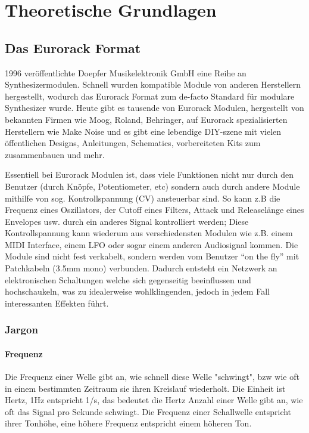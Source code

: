 \chapter{Theoretische Grundlagen}

\section{Das Eurorack Format}
\label{sec:org68c13b5}

1996 veröffentlichte Doepfer Musikelektronik GmbH eine Reihe an Synthesizermodulen. Schnell wurden kompatible Module von anderen Herstellern hergestellt, wodurch das Eurorack Format zum de-facto Standard für modulare Synthesizer wurde. Heute gibt es tausende von Eurorack Modulen, hergestellt von bekannten Firmen wie Moog, Roland, Behringer, auf Eurorack spezialisierten Herstellern wie Make Noise und es gibt eine lebendige DIY-szene mit vielen öffentlichen Designs, Anleitungen, Schematics, vorbereiteten Kits zum zusammenbauen und mehr.

Essentiell bei Eurorack Modulen ist, dass viele Funktionen nicht nur durch den Benutzer (durch Knöpfe, Potentiometer, etc) sondern auch durch andere Module mithilfe von sog. Kontrollspannung (CV) ansteuerbar sind. So kann z.B die Frequenz eines Oszillators, der Cutoff eines Filters, Attack und Releaselänge eines Envelopes usw. durch ein anderes Signal kontrolliert werden; Diese Kontrollspannung kann wiederum aus verschiedensten Modulen wie z.B. einem MIDI Interface, einem LFO oder sogar einem anderen Audiosignal kommen. Die Module sind nicht fest verkabelt, sondern werden vom Benutzer ``on the fly'' mit Patchkabeln (3.5mm mono) verbunden. Dadurch entsteht ein Netzwerk an elektronischen Schaltungen welche sich gegenseitig beeinflussen und hochschaukeln, was zu idealerweise wohlklingenden, jedoch in jedem Fall interessanten Effekten führt.

\subsection{Jargon}
\label{sec:org720f6d8}
\subsubsection{Frequenz}
\label{sec:org9846a3c}
Die Frequenz einer Welle gibt an, wie schnell diese Welle "schwingt", bzw wie oft in einem bestimmten Zeitraum sie ihren Kreislauf wiederholt. Die Einheit ist Hertz, 1Hz entspricht 1/s, das bedeutet die Hertz Anzahl einer Welle gibt an, wie oft das Signal pro Sekunde schwingt. Die Frequenz einer Schallwelle entspricht ihrer Tonhöhe, eine höhere Frequenz entspricht einem höheren Ton.


